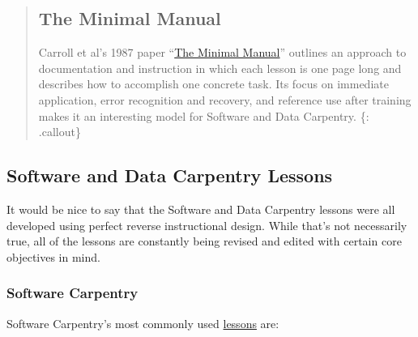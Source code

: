 \begin{quote}
\subsection{The Minimal Manual}\label{the-minimal-manual}

Carroll et al's 1987 paper
``\href{\{\{\%20page.root\%20\}\}/files/papers/carroll-minimal-manual-1987.pdf}{The
Minimal Manual}'' outlines an approach to documentation and instruction
in which each lesson is one page long and describes how to accomplish
one concrete task. Its focus on immediate application, error recognition
and recovery, and reference use after training makes it an interesting
model for Software and Data Carpentry. \{: .callout\}
\end{quote}

\subsection{Software and Data Carpentry
Lessons}\label{software-and-data-carpentry-lessons}

It would be nice to say that the Software and Data Carpentry lessons
were all developed using perfect reverse instructional design. While
that's not necessarily true, all of the lessons are constantly being
revised and edited with certain core objectives in mind.

\subsubsection{Software Carpentry}\label{software-carpentry}

Software Carpentry's most commonly used
\href{\{\{\%20site.swc_site\%20\}\}/lessons/}{lessons} are:


